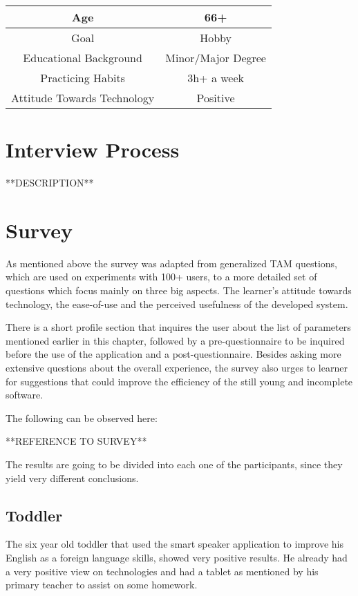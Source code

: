 \begin{center}
	\begin{tabular}{ | c | c | }
	\hline
		Age & 66+ \\
	\hline
		Goal & Hobby \\
	\hline
		Educational Background & Minor/Major Degree \\
	\hline
		Practicing Habits & 3h+ a week \\
	\hline
		Attitude Towards Technology & Positive \\
	\hline

	\end{tabular}
\end{center}


\section{Interview Process}

**DESCRIPTION**

 
\section{Survey}

As mentioned above the survey was adapted from generalized 
TAM questions, which are used on experiments with 100+ users, to a more detailed
set of questions which focus mainly on three big aspects. The learner's 
attitude towards technology, the ease-of-use and the perceived usefulness of
the developed system.

There is a short profile section that inquires the user about the list of 
parameters mentioned earlier in this chapter, followed by a pre-questionnaire
to be inquired before the use of the application 
and a post-questionnaire. Besides asking more extensive questions about the
overall experience, the survey also urges to learner for suggestions that could
improve the efficiency of the still young and incomplete software.

The following can be observed here:

**REFERENCE TO SURVEY**

The results are going to be divided into each one of the participants, since 
they yield very different conclusions.



\subsection{Toddler}
The six year old toddler that used the smart speaker application to improve
his English as a foreign language skills, showed very positive results. He
already had a very positive view on technologies and had a tablet as mentioned
by his primary teacher to assist on some homework.

